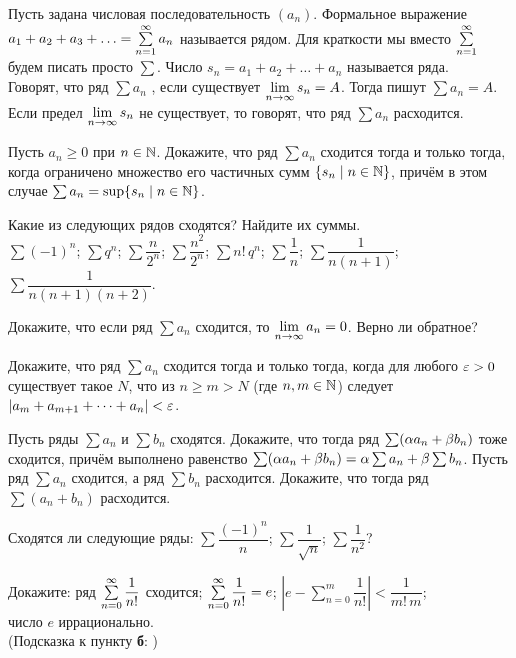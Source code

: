 \documentclass[a4paper,12pt]{article}
\begin{document}

Пусть задана числовая последовательность $(a_n)$. Формальное выражение $a_1+a_2+a_3+\ldots=\sum\limits_{n=1}^{\infty} a_n$ называется  рядом. Для краткости мы вместо $\sum\limits_{n=1}^{\infty}$ будем писать просто $\sum$. Число $s_n=a_1+a_2+\ldots+a_n$ называется  ряда.\\
Говорят, что ряд $\sum a_n$ , если существует $\lim\limits_{n \rightarrow \infty} s_n=A$. Тогда пишут $\sum a_n=A$. Если предел $\lim\limits_{n \rightarrow \infty} s_n$ не существует, то говорят, что ряд $\sum a_n$  расходится.

Пусть $a_n \ge 0$ при $n\in\mathbb{N}$. Докажите, что ряд $\sum a_n$ сходится тогда и только тогда, когда ограничено множество его частичных сумм $\{s_n \mid n\in\mathbb{N}\}$, причём в этом случае $\sum a_n=\sup\{s_n \mid n\in\mathbb{N}\}$.

Какие из следующих рядов сходятся? Найдите их суммы.\\
$\sum (-1)^n$;
$\sum q^n$;
$\sum \dfrac{n}{2^n}$;
$\sum \dfrac{n^2}{2^n}$;
$\sum n!\,q^n$;
$\sum \dfrac1n$;
$\sum \dfrac1{n(n+1)}$;
$\sum \dfrac1{n(n+1)(n+2)}$.

Докажите, что если ряд $\sum a_n$ сходится, то $\lim\limits_{n \rightarrow \infty} a_n=0$. Верно ли обратное?

Докажите, что ряд $\sum a_n$ сходится тогда и только тогда, когда для любого $\varepsilon>0$ существует такое $N$, что из $n\ge m>N$ (где $n,m\in\mathbb{N}$) следует $|a_m+a_{m+1}+\dots+a_n|<\varepsilon$.

Пусть ряды $\sum a_n$ и $\sum b_n$ сходятся. Докажите, что тогда ряд $\sum (\alpha a_n+\beta b_n)$ тоже сходится, причём выполнено равенство $\sum (\alpha a_n+\beta b_n)=
\alpha\sum a_n+\beta\sum b_n$.
Пусть ряд $\sum a_n$ сходится, а ряд $\sum b_n$ расходится. Докажите, что тогда ряд $\sum (a_n+b_n)$ расходится.

Сходятся ли следующие ряды:
$\sum \dfrac{(-1)^n}{n}$;
$\sum \dfrac1{\sqrt{n}}$;
$\sum \dfrac1{n^2}$?

Докажите:
ряд $\sum\limits_{n=0}^{\infty}\dfrac1{n!}$ сходится;
$\sum\limits_{n=0}^{\infty}\dfrac1{n!}=e$;
$\left|e-\sum\limits_{n=0}^m\dfrac1{n!}\right|<\dfrac1{m!\,m}$;\\
число $e$ иррационально.\\
(Подсказка к пункту \textbf{б}:\,\,{})
\end{document}
